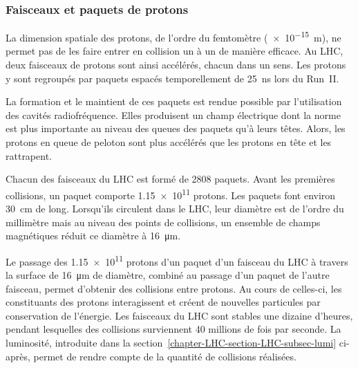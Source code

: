 \subsubsection{Faisceaux et paquets de protons}
La dimension spatiale des protons, de l'ordre du femtomètre (\SI{e-15}{\meter}), ne permet pas de les faire entrer en collision un à un de manière efficace.
Au LHC, deux faisceaux de protons sont ainsi accélérés, chacun dans un sens.
Les protons y sont regroupés par paquets espacés temporellement de \SI{25}{\nano\second} lors du Run~II.
\par La formation et le maintient de ces paquets est rendue possible par l'utilisation des cavités radiofréquence.
Elles produisent un champ électrique dont la norme est plus importante au niveau des queues des paquets qu'à leurs têtes.
Alors, les protons \og en queue de peloton \fg{} sont plus accélérés que les protons en tête et les rattrapent.
\par
Chacun des faisceaux du LHC est formé de 2808 paquets.
Avant les premières collisions, un paquet comporte \num{1.15e11} protons.
Les paquets font environ \SI{30}{\centi\meter} de long.
Lorsqu'ils circulent dans le LHC, leur diamètre est de l'ordre du millimètre mais au niveau des points de collisions, un ensemble de champs magnétiques réduit ce diamètre à \SI{16}{\micro\meter}.
\par Le passage des \num{1.15e11} protons d'un paquet d'un faisceau du LHC à travers la surface de \SI{16}{\micro\meter} de diamètre, combiné au passage d'un paquet de l'autre faisceau, permet d'obtenir des collisions entre protons.
Au cours de celles-ci, les constituants des protons interagissent et créent de nouvelles particules par conservation de l'énergie.
Les faisceaux du LHC sont stables une dizaine d'heures, pendant lesquelles des collisions surviennent 40 millions de fois par seconde.
La luminosité, introduite dans la section~\ref{chapter-LHC-section-LHC-subsec-lumi} ci-après, permet de rendre compte de la quantité de collisions réalisées.
